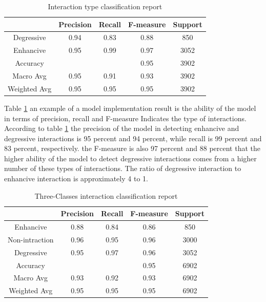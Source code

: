 \documentclass{bmcart}
\begin{document}
\begin{table}[h!]
\centering
\begin{tabular}{|c|c|c|c|c|}
\hline
& Precision & Recall & F-measure & Support \\
\hline
Degressive & 0.94 & 0.83 & 0.88 & 850 \\
\hline
Enhancive & 0.95 & 0.99 & 0.97 & 3052 \\
\hline
Accuracy &  & & 0.95 &3902\\
\hline
Macro Avg & 0.95 & 0.91 & 0.93 & 3902\\
\hline
Weighted Avg & 0.95 & 0.95 &0.95 & 3902\\
\hline
\end{tabular}
\newline
	\caption{Interaction type classification report}
	\label{classificatonReport}
\end{table}

Table
\ref{classificatonReport}
an example of a model implementation result is the ability of the model in terms of precision, recall and F-measure Indicates the type of interactions. According to table
\ref{classificatonReport}
the precision of the model in detecting enhancive and degressive interactions is 95 percent and 94 percent, while recall is 99 percent and 83 percent, respectively. the F-measure is also 97  percent and 88 percent that the higher ability of the model to detect degressive interactions comes from a higher number of these types of interactions. The ratio of degressive interaction to enhancive interaction is approximately 4 to 1.

\begin{table}[h!]
\centering
\begin{tabular}{|c|c|c|c|c|}
\hline
& Precision & Recall & F-measure & Support  \\
\hline
Enhancive & 0.88 & 0.84 & 0.86 & 850\\
\hline
Non-intraction & 0.96 & 0.95 & 0.96 & 3000\\
\hline
Degressive & 0.95 & 0.97 & 0.96 & 3052\\
\hline
Accuracy &  & & 0.95 &6902\\
\hline
Macro Avg & 0.93 & 0.92 & 0.93 & 6902 \\
\hline
Weighted Avg & 0.95 & 0.95 &0.95 & 6902\\
\hline
\end{tabular}
\newline
	\caption{Three-Classes interaction classification report}
	\label{TripleclassificatonReport}
\end{table}
\end{document}
